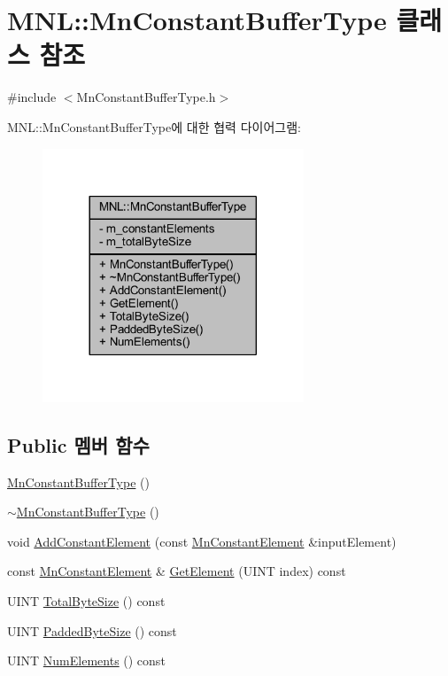 \hypertarget{class_m_n_l_1_1_mn_constant_buffer_type}{}\section{M\+NL\+:\+:Mn\+Constant\+Buffer\+Type 클래스 참조}
\label{class_m_n_l_1_1_mn_constant_buffer_type}


{\ttfamily \#include $<$Mn\+Constant\+Buffer\+Type.\+h$>$}



M\+NL\+:\+:Mn\+Constant\+Buffer\+Type에 대한 협력 다이어그램\+:\nopagebreak
\begin{figure}[H]
\begin{center}
\leavevmode
\includegraphics[width=221pt]{class_m_n_l_1_1_mn_constant_buffer_type__coll__graph}
\end{center}
\end{figure}
\subsection*{Public 멤버 함수}
\begin{DoxyCompactItemize}
\item 
\hyperlink{class_m_n_l_1_1_mn_constant_buffer_type_adb400b9153ea587f4f1ed5173c9fe0e5}{Mn\+Constant\+Buffer\+Type} ()
\item 
\hyperlink{class_m_n_l_1_1_mn_constant_buffer_type_a379082879b3a4e9220ea3ded514b8982}{$\sim$\+Mn\+Constant\+Buffer\+Type} ()
\item 
void \hyperlink{class_m_n_l_1_1_mn_constant_buffer_type_ae9221d7fff984c158938611cf05666dc}{Add\+Constant\+Element} (const \hyperlink{class_m_n_l_1_1_mn_constant_element}{Mn\+Constant\+Element} \&input\+Element)
\item 
const \hyperlink{class_m_n_l_1_1_mn_constant_element}{Mn\+Constant\+Element} \& \hyperlink{class_m_n_l_1_1_mn_constant_buffer_type_a4e5740ac5ebdcf8dc0473721c0a6391f}{Get\+Element} (U\+I\+NT index) const
\item 
U\+I\+NT \hyperlink{class_m_n_l_1_1_mn_constant_buffer_type_aae1e8677534067f7019df4326ddfaf4d}{Total\+Byte\+Size} () const
\item 
U\+I\+NT \hyperlink{class_m_n_l_1_1_mn_constant_buffer_type_a12c8039ed9335db7db09f9628347080c}{Padded\+Byte\+Size} () const
\item 
U\+I\+NT \hyperlink{class_m_n_l_1_1_mn_constant_buffer_type_a1f7946e71fb2708c4e43066cb99cba4f}{Num\+Elements} () const
\end{DoxyCompactItemize}
